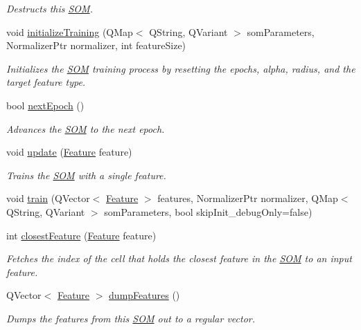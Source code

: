 \begin{DoxyCompactItemize}
\begin{DoxyCompactList}\small\item\em \-Destructs this \hyperlink{classhsom_1_1_s_o_m}{\-S\-O\-M}. \end{DoxyCompactList}\item 
void \hyperlink{classhsom_1_1_s_o_m_ab49f133b064128ddce266f806ece2229}{initialize\-Training} (\-Q\-Map$<$ \-Q\-String, \-Q\-Variant $>$ som\-Parameters, \-Normalizer\-Ptr normalizer, int feature\-Size)
\begin{DoxyCompactList}\small\item\em \-Initializes the \hyperlink{classhsom_1_1_s_o_m}{\-S\-O\-M} training process by resetting the epochs, alpha, radius, and the target feature type. \end{DoxyCompactList}\item 
bool \hyperlink{classhsom_1_1_s_o_m_a48f8a8d75b242f13536dafaf6cd1f4b0}{next\-Epoch} ()
\begin{DoxyCompactList}\small\item\em \-Advances the \hyperlink{classhsom_1_1_s_o_m}{\-S\-O\-M} to the next epoch. \end{DoxyCompactList}\item 
void \hyperlink{classhsom_1_1_s_o_m_a0a538a4ffbb3701eed2dce4701ab9ffa}{update} (\hyperlink{classhsom_1_1_feature}{\-Feature} feature)
\begin{DoxyCompactList}\small\item\em \-Trains the \hyperlink{classhsom_1_1_s_o_m}{\-S\-O\-M} with a single feature. \end{DoxyCompactList}\item 
void \hyperlink{classhsom_1_1_s_o_m_af2da5b87e68a9c593d69b345ac0cffee}{train} (\-Q\-Vector$<$ \hyperlink{classhsom_1_1_feature}{\-Feature} $>$ features, \-Normalizer\-Ptr normalizer, \-Q\-Map$<$ \-Q\-String, \-Q\-Variant $>$ som\-Parameters, bool skip\-Init\-\_\-debug\-Only=false)
\item 
int \hyperlink{classhsom_1_1_s_o_m_a24d43f02fbf821f5ef25530906f73d85}{closest\-Feature} (\hyperlink{classhsom_1_1_feature}{\-Feature} feature)
\begin{DoxyCompactList}\small\item\em \-Fetches the index of the cell that holds the closest feature in the \hyperlink{classhsom_1_1_s_o_m}{\-S\-O\-M} to an input feature. \end{DoxyCompactList}\item 
\hypertarget{classhsom_1_1_s_o_m_a86b03005201c40b1f657c2811ff5b51c}{\-Q\-Vector$<$ \hyperlink{classhsom_1_1_feature}{\-Feature} $>$ \hyperlink{classhsom_1_1_s_o_m_a86b03005201c40b1f657c2811ff5b51c}{dump\-Features} ()}\label{classhsom_1_1_s_o_m_a86b03005201c40b1f657c2811ff5b51c}

\begin{DoxyCompactList}\small\item\em \-Dumps the features from this \hyperlink{classhsom_1_1_s_o_m}{\-S\-O\-M} out to a regular vector. \end{DoxyCompactList}\end{DoxyCompactItemize}


